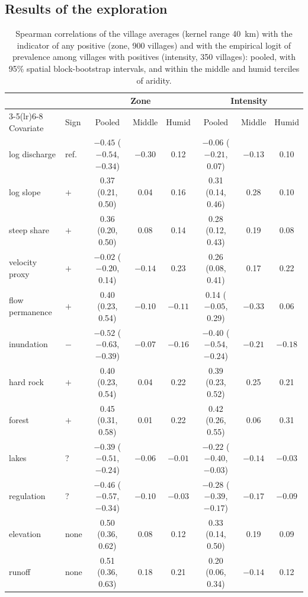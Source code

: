 \documentclass[11pt,a4paper]{article}
\begin{document}
\subsection*{Results of the exploration}

\begin{table}[H]
\centering
\footnotesize\setlength{\tabcolsep}{4pt}
\caption{Spearman correlations of the village averages (kernel range 40~km) with the indicator of any positive (zone, 900 villages) and with the empirical logit of prevalence among villages with positives (intensity, 350 villages): pooled, with 95\% spatial block-bootstrap intervals, and within the middle and humid terciles of aridity.}
\label{tab:eda}
\begin{tabular}{llcccccc}
\toprule
 & & \multicolumn{3}{c}{Zone} & \multicolumn{3}{c}{Intensity} \\
\cmidrule(lr){3-5}\cmidrule(lr){6-8}
Covariate & Sign & Pooled & Middle & Humid & Pooled & Middle & Humid \\
\midrule
log discharge & ref. & $-0.45$ ($-0.54$, $-0.34$) & $-0.30$ & 0.12 & $-0.06$ ($-0.21$, 0.07) & $-0.13$ & 0.10 \\
log slope & $+$ & 0.37 (0.21, 0.50) & 0.04 & 0.16 & 0.31 (0.14, 0.46) & 0.28 & 0.10 \\
steep share & $+$ & 0.36 (0.20, 0.50) & 0.08 & 0.14 & 0.28 (0.12, 0.43) & 0.19 & 0.08 \\
velocity proxy & $+$ & $-0.02$ ($-0.20$, 0.14) & $-0.14$ & 0.23 & 0.26 (0.08, 0.41) & 0.17 & 0.22 \\
flow permanence & $+$ & 0.40 (0.23, 0.54) & $-0.10$ & $-0.11$ & 0.14 ($-0.05$, 0.29) & $-0.33$ & 0.06 \\
inundation & $-$ & $-0.52$ ($-0.63$, $-0.39$) & $-0.07$ & $-0.16$ & $-0.40$ ($-0.54$, $-0.24$) & $-0.21$ & $-0.18$ \\
hard rock & $+$ & 0.40 (0.23, 0.54) & 0.04 & 0.22 & 0.39 (0.23, 0.52) & 0.25 & 0.21 \\
forest & $+$ & 0.45 (0.31, 0.58) & 0.01 & 0.22 & 0.42 (0.26, 0.55) & 0.06 & 0.31 \\
lakes & ? & $-0.39$ ($-0.51$, $-0.24$) & $-0.06$ & $-0.01$ & $-0.22$ ($-0.40$, $-0.03$) & $-0.14$ & $-0.03$ \\
regulation & ? & $-0.46$ ($-0.57$, $-0.34$) & $-0.10$ & $-0.03$ & $-0.28$ ($-0.39$, $-0.17$) & $-0.17$ & $-0.09$ \\
elevation & none & 0.50 (0.36, 0.62) & 0.08 & 0.12 & 0.33 (0.14, 0.50) & 0.19 & 0.09 \\
runoff & none & 0.51 (0.36, 0.63) & 0.18 & 0.21 & 0.20 (0.06, 0.34) & $-0.14$ & 0.12 \\
\bottomrule
\end{tabular}
\end{table}
\end{document}
